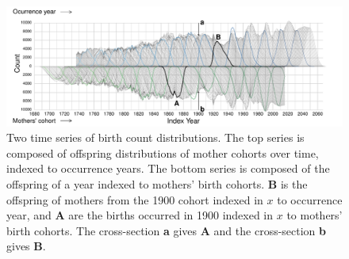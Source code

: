\documentclass{article}
\begin{document}
\begin{figure}[ht!]
 \centering
        \includegraphics[width=\textwidth]{Figures/FxFlowReflect.pdf}
        \caption{Two time series of birth count distributions. The top series is composed of offspring distributions of mother cohorts over time, indexed to occurrence years. The bottom series is composed of the offspring of a year indexed to mothers' birth cohorts. \textbf{B} is the offspring of mothers from the 1900 cohort indexed in $x$ to occurrence year, and \textbf{A} are the births occurred in 1900 indexed in $x$ to mothers' birth cohorts. The cross-section \textbf{a} gives \textbf{A} and the cross-section \textbf{b} gives \textbf{B}.}
          \label{fig:reflect1}
\end{figure}
\end{document}

